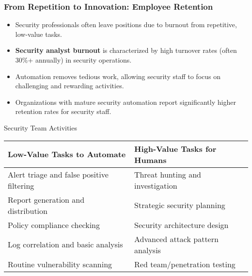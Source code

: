 \documentclass{beamer}
\begin{document}
\begin{frame}
  \frametitle{From Repetition to Innovation: Employee Retention}
  
  \begin{itemize}
    \item Security professionals often leave positions due to burnout from repetitive, low-value tasks.
    \item \textbf{Security analyst burnout} is characterized by high turnover rates (often 30\%+ annually) in security operations.
    \item Automation removes tedious work, allowing security staff to focus on challenging and rewarding activities.
    \item Organizations with mature security automation report significantly higher retention rates for security staff.
  \end{itemize}
  
  \begin{alertblock}{Security Team Activities}
    \scriptsize
    \begin{tabular}{|p{}|p{}|}
      \hline
      \textbf{Low-Value Tasks to Automate} & \textbf{High-Value Tasks for Humans} \\
      \hline
      Alert triage and false positive filtering & Threat hunting and investigation \\
      Report generation and distribution & Strategic security planning \\
      Policy compliance checking & Security architecture design \\
      Log correlation and basic analysis & Advanced attack pattern analysis \\
      Routine vulnerability scanning & Red team/penetration testing \\
      \hline
    \end{tabular}
  \end{alertblock}
\end{frame}
\end{document}
